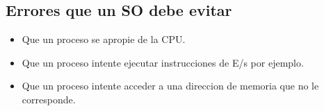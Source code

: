 \subsection{Errores que un SO debe evitar}
\begin{itemize}
    \item Que un proceso se apropie de la CPU.
    \item Que un proceso intente ejecutar instrucciones de E/s por ejemplo.
        \item Que un proceso intente acceder a una direccion de memoria que no le corresponde.
\end{itemize}


\pagebreak
